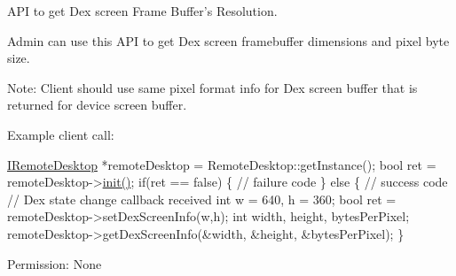 \-A\-P\-I to get \-Dex screen \-Frame \-Buffer's \-Resolution. 

\-Admin can use this \-A\-P\-I to get \-Dex screen framebuffer dimensions and pixel byte size.

\-Note\-: \-Client should use same pixel format info for \-Dex screen buffer that is returned for device screen buffer.

\-Example client call\-:


\begin{DoxyPre}
  \hyperlink{classknoxremotedesktop_1_1IRemoteDesktop}{IRemoteDesktop} *remoteDesktop = RemoteDesktop::getInstance();
  bool ret = remoteDesktop->\hyperlink{classknoxremotedesktop_1_1IRemoteDesktop_a7bed40d98c61713a69cf1dad8b37beae}{init()};
  if(ret == false)  \{
     // failure code
  \} else \{
     // success code	 
     // Dex state change callback received
     int w = 640, h = 360;
     bool ret = remoteDesktop->setDexScreenInfo(w,h);
     int width, height, bytesPerPixel;
     remoteDesktop->getDexScreenInfo(&width, &height, &bytesPerPixel);
  \}
 \end{DoxyPre}


\begin{DoxyParagraph}{\-Permission\-: }
\-None
\end{DoxyParagraph}

